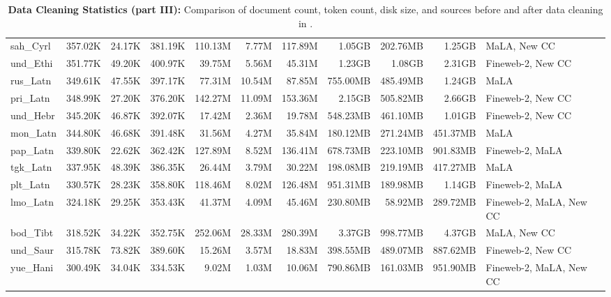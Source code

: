 \begin{table*}[!htp]
{\begin{tabular}{l|rrr|rrr|rrr|l}
sah\_Cyrl                   & 357.02K    & 24.17K       & 381.19K     & 110.13M      & 7.77M          & 117.89M       & 1.05GB     & 202.76MB     & 1.25GB      & MaLA, New CC            \\
und\_Ethi                   & 351.77K    & 49.20K       & 400.97K     & 39.75M       & 5.56M          & 45.31M        & 1.23GB     & 1.08GB       & 2.31GB      & Fineweb-2, New CC       \\
rus\_Latn                   & 349.61K    & 47.55K       & 397.17K     & 77.31M       & 10.54M         & 87.85M        & 755.00MB   & 485.49MB     & 1.24GB      & MaLA                    \\
pri\_Latn                   & 348.99K    & 27.20K       & 376.20K     & 142.27M      & 11.09M         & 153.36M       & 2.15GB     & 505.82MB     & 2.66GB      & Fineweb-2, New CC       \\
und\_Hebr                   & 345.20K    & 46.87K       & 392.07K     & 17.42M       & 2.36M          & 19.78M        & 548.23MB   & 461.10MB     & 1.01GB      & Fineweb-2, New CC       \\
mon\_Latn                   & 344.80K    & 46.68K       & 391.48K     & 31.56M       & 4.27M          & 35.84M        & 180.12MB   & 271.24MB     & 451.37MB    & MaLA                    \\
pap\_Latn                   & 339.80K    & 22.62K       & 362.42K     & 127.89M      & 8.52M          & 136.41M       & 678.73MB   & 223.10MB     & 901.83MB    & Fineweb-2, MaLA         \\
tgk\_Latn                   & 337.95K    & 48.39K       & 386.35K     & 26.44M       & 3.79M          & 30.22M        & 198.08MB   & 219.19MB     & 417.27MB    & MaLA                    \\
plt\_Latn                   & 330.57K    & 28.23K       & 358.80K     & 118.46M      & 8.02M          & 126.48M       & 951.31MB   & 189.98MB     & 1.14GB      & Fineweb-2, MaLA         \\
lmo\_Latn                   & 324.18K    & 29.25K       & 353.43K     & 41.37M       & 4.09M          & 45.46M        & 230.80MB   & 58.92MB      & 289.72MB    & Fineweb-2, MaLA, New CC \\
bod\_Tibt                   & 318.52K    & 34.22K       & 352.75K     & 252.06M      & 28.33M         & 280.39M       & 3.37GB     & 998.77MB     & 4.37GB      & MaLA, New CC            \\
und\_Saur                   & 315.78K    & 73.82K       & 389.60K     & 15.26M       & 3.57M          & 18.83M        & 398.55MB   & 489.07MB     & 887.62MB    & Fineweb-2, New CC       \\
yue\_Hani                   & 300.49K    & 34.04K       & 334.53K     & 9.02M        & 1.03M          & 10.06M        & 790.86MB   & 161.03MB     & 951.90MB    & Fineweb-2, MaLA, New CC \\
\bottomrule
\end{tabular}}
\caption{
\label{tab_app:data_clean_3}
\textbf{Data Cleaning Statistics (part III):} Comparison of document count, token count, disk size, and sources before and after data cleaning  in \dcad.
}
\end{table*}

